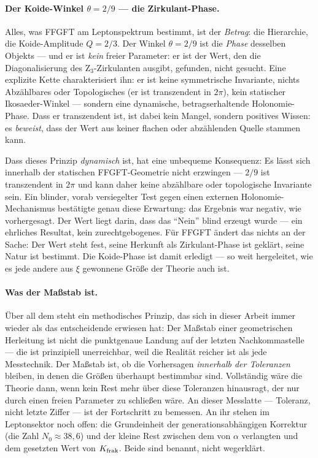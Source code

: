 \paragraph{Der Koide-Winkel $\theta = 2/9$ --- die Zirkulant-Phase.} Alles, was FFGFT am Leptonspektrum bestimmt, ist der
\emph{Betrag}: die Hierarchie, die Koide-Amplitude $Q = 2/3$. Der Winkel $\theta = 2/9$ ist die \emph{Phase} desselben Objekts --- und er
ist \emph{kein} freier Parameter: er ist der Wert, den die Diagonalisierung
des Z$_3$-Zirkulanten ausgibt, gefunden, nicht gesucht. Eine explizite Kette charakterisiert ihn: er ist keine symmetrische
Invariante, nichts Abzählbares oder Topologisches (er ist transzendent in
$2\pi$), kein statischer Ikosaeder-Winkel --- sondern eine dynamische,
betragserhaltende Holonomie-Phase. Dass er transzendent ist, ist dabei kein
Mangel, sondern positives Wissen: es \emph{beweist}, dass der Wert aus keiner
flachen oder abzählenden Quelle stammen kann.

Dass dieses Prinzip \emph{dynamisch} ist, hat eine unbequeme Konsequenz:
Es lässt sich innerhalb der statischen FFGFT-Geometrie nicht erzwingen ---
$2/9$ ist transzendent in $2\pi$ und kann daher keine abzählbare oder
topologische Invariante sein. Ein blinder, vorab versiegelter Test gegen
einen externen Holonomie-Mechanismus bestätigte genau diese Erwartung: das
Ergebnis war negativ, wie vorhergesagt. Der Wert liegt darin, dass das
\enquote{Nein} blind erzeugt wurde --- ein ehrliches Resultat, kein
zurechtgebogenes. Für FFGFT ändert das nichts an der Sache: Der Wert steht
fest, seine Herkunft als Zirkulant-Phase ist geklärt, seine Natur ist
bestimmt. Die Koide-Phase ist damit erledigt --- so weit hergeleitet, wie es
jede andere aus $\xi$ gewonnene Größe der Theorie auch ist.

\paragraph{Was der Maßstab ist.} Über all dem steht ein methodisches
Prinzip, das sich in dieser Arbeit immer wieder als das entscheidende
erwiesen hat: Der Maßstab einer geometrischen Herleitung ist nicht die
punktgenaue Landung auf der letzten Nachkommastelle --- die ist
prinzipiell unerreichbar, weil die Realität reicher ist als jede
Messtechnik. Der Maßstab ist, ob die Vorhersagen \emph{innerhalb der
Toleranzen} bleiben, in denen die Größen überhaupt bestimmbar sind.
Vollständig wäre die Theorie dann, wenn kein Rest mehr über diese
Toleranzen hinausragt, der nur durch einen freien Parameter zu schließen
wäre. An dieser Messlatte --- Toleranz, nicht letzte Ziffer --- ist der
Fortschritt zu bemessen. An ihr stehen im Leptonsektor noch offen: die
Grundeinheit der generationsabhängigen Korrektur (die Zahl
$N_0 \approx 38{,}6$) und der kleine Rest zwischen dem von $\alpha$
verlangten und dem gesetzten Wert von $K_{\rm frak}$. Beide sind
benannt, nicht wegerklärt.

